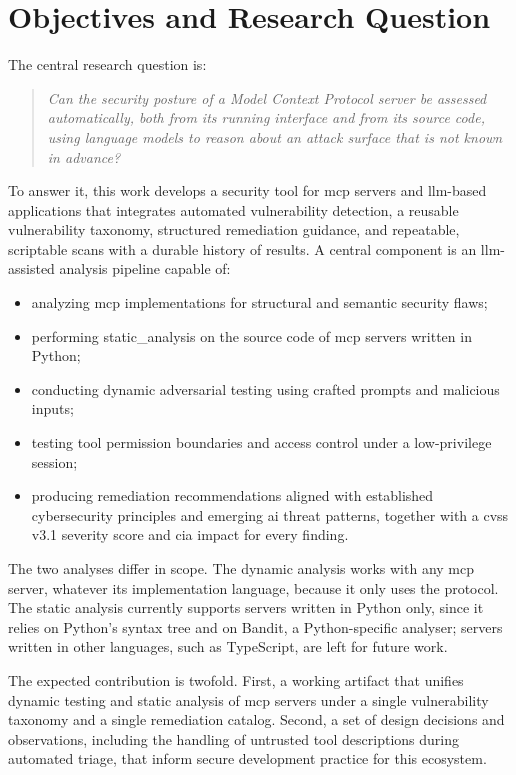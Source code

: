\section{Objectives and Research Question}
\label{sec:objectives}

The central research question is:

\begin{quote}
\textit{Can the security posture of a Model Context Protocol server be assessed automatically, both from its running interface and from its source code, using language models to reason about an attack surface that is not known in advance?}
\end{quote}

To answer it, this work develops a security tool for \gls{mcp} servers and \gls{llm}-based applications that integrates automated vulnerability detection, a reusable vulnerability taxonomy, structured remediation guidance, and repeatable, scriptable scans with a durable history of results. A central component is an \gls{llm}-assisted analysis pipeline capable of:

\begin{itemize}
    \item analyzing \gls{mcp} implementations for structural and semantic security flaws;
    \item performing \gls{static_analysis} on the source code of \gls{mcp} servers written in Python;
    \item conducting dynamic adversarial testing using crafted prompts and malicious inputs;
    \item testing tool permission boundaries and access control under a low-privilege session;
    \item producing remediation recommendations aligned with established cybersecurity principles and emerging \gls{ai} threat patterns, together with a \gls{cvss} v3.1 severity score and \gls{cia} impact for every finding.
\end{itemize}

The two analyses differ in scope. The dynamic analysis works with any \gls{mcp} server, whatever its implementation language, because it only uses the protocol. The static analysis currently supports servers written in Python only, since it relies on Python's syntax tree and on Bandit, a Python-specific analyser; servers written in other languages, such as TypeScript, are left for future work.

The expected contribution is twofold. First, a working artifact that unifies dynamic testing and static analysis of \gls{mcp} servers under a single vulnerability taxonomy and a single remediation catalog. Second, a set of design decisions and observations, including the handling of untrusted tool descriptions during automated triage, that inform secure development practice for this ecosystem.


